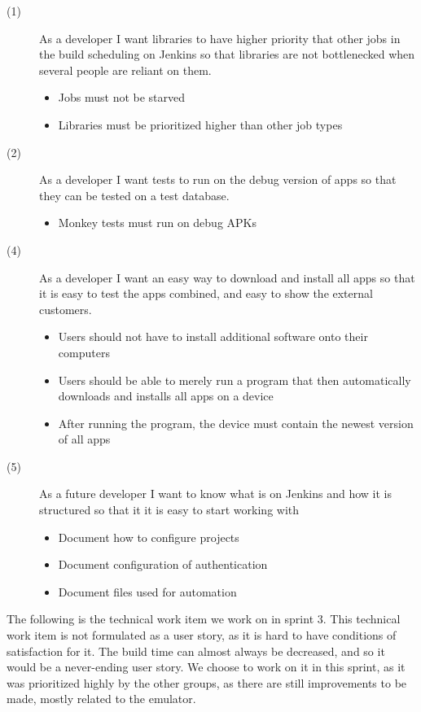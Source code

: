 \begin{description}
  \item[(1)] As a developer I want libraries to have higher priority that other jobs in the build scheduling on Jenkins so that libraries are not bottlenecked when several people are reliant on them.
  \begin{itemize}
    \item Jobs must not be starved
    \item Libraries must be prioritized higher than other job types
  \end{itemize}
  \item[(2)] As a developer I want tests to run on the debug version of apps so that they can be tested on a test database.
  \begin{itemize}
    \item Monkey tests must run on debug APKs
  \end{itemize}
  \item[(4)] As a developer I want an easy way to download and install all apps so that it is easy to test the apps combined, and easy to show the external customers.
  \begin{itemize}
    \item Users should not have to install additional software onto their computers
    \item Users should be able to merely run a program that then automatically downloads and installs all apps on a device
    \item After running the program, the device must contain the newest version of all apps
  \end{itemize}
  \item[(5)] As a future developer I want to know what is on Jenkins and how it is structured so that it it is easy to start working with
  \begin{itemize}
    \item Document how to configure projects
    \item Document configuration of authentication
    \item Document files used for automation
  \end{itemize}
\end{description}

The following is the technical work item we work on in sprint 3. This technical work item is not formulated as a user story, as it is hard to have conditions of satisfaction for it. The build time can almost always be decreased, and so it would be a never-ending user story. We choose to work on it in this sprint, as it was prioritized highly by the other groups, as there are still improvements to be made, mostly related to the emulator.

